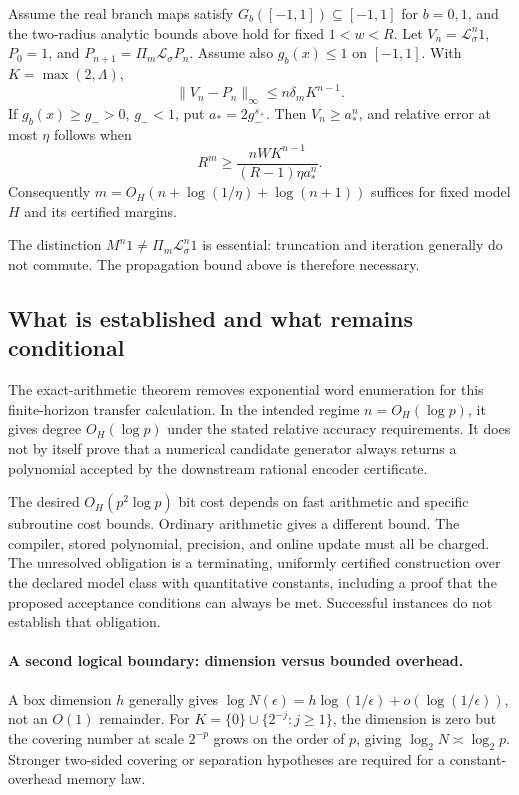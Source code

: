\begin{theorem}\label{III:U:thm:oracle}
Assume the real branch maps satisfy $G_b([-1,1])\subseteq[-1,1]$ for $b=0,1$, and the two-radius analytic bounds above hold for fixed $1<w<R$.
Let $V_n=\mathcal L_\sigma^n1$, $P_0=1$, and
$P_{n+1}=\Pi_m\mathcal L_\sigma P_n$. Assume also $g_b(x)\le1$
on $[-1,1]$. With $K=\max(2,\Lambda)$,
\[
 \|V_n-P_n\|_\infty\le n\delta_mK^{n-1}.
\]
If $g_b(x)\ge g_->0$, $g_-<1$, put $a_*=2g_-^{s_+}$.
Then $V_n\ge a_*^n$, and relative error at most $\eta$ follows when
\[
 R^m\ge\frac{nWK^{n-1}}{(R-1)\eta a_*^n}.
\]
Consequently $m=O_H(n+\log(1/\eta)+\log(n+1))$ suffices for fixed
model $H$ and its certified margins.
\end{theorem}


The distinction $M^n1\ne\Pi_m\mathcal L_\sigma^n1$ is essential:
truncation and iteration generally do not commute. The propagation bound
above is therefore necessary.

\subsection{What is established and what remains conditional}
The exact-arithmetic theorem removes exponential word enumeration for this
finite-horizon transfer calculation. In the intended regime
$n=O_H(\log p)$, it gives degree $O_H(\log p)$ under the stated relative
accuracy requirements. It does not by itself prove that a numerical
candidate generator always returns a polynomial accepted by the downstream
rational encoder certificate.

The desired $O_H(p^2\log p)$ bit cost depends on fast arithmetic and
specific subroutine cost bounds. Ordinary arithmetic gives a different
bound. The compiler, stored polynomial, precision, and online update
must all be charged. The unresolved obligation is a terminating, uniformly certified construction over the
declared model class with quantitative constants, including a proof that
the proposed acceptance conditions can always be met. Successful instances
do not establish that obligation.

\paragraph{A second logical boundary: dimension versus bounded overhead.}
A box dimension $h$ generally gives
$\log N(\epsilon)=h\log(1/\epsilon)+o(\log(1/\epsilon))$, not an
$O(1)$ remainder. For $K=\{0\}\cup\{2^{-j}:j\ge1\}$, the dimension
is zero but the covering number at scale $2^{-p}$ grows on the order of
$p$, giving $\log_2N\asymp\log_2p$. Stronger two-sided covering or
separation hypotheses are required for a constant-overhead memory law.
